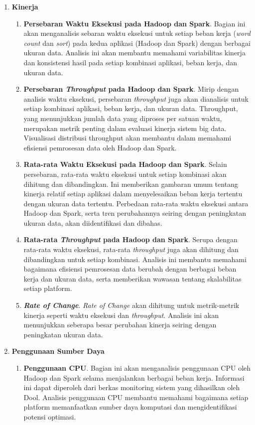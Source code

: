 \begin{enumerate}	
	\item \textbf{Kinerja}
	\begin{enumerate}
		\item \textbf{Persebaran Waktu Eksekusi pada Hadoop dan Spark}. Bagian ini akan menganalisis sebaran waktu eksekusi untuk setiap beban kerja (\textit{word count} dan \textit{sort}) pada kedua aplikasi (Hadoop dan Spark) dengan berbagai ukuran data. Analisis ini akan membantu memahami variabilitas kinerja dan konsistensi hasil pada setiap kombinasi aplikasi, beban kerja, dan ukuran data.
		\item \textbf{Persebaran \textit{Throughput} pada Hadoop dan Spark}. Mirip dengan analisis waktu eksekusi, persebaran \textit{throughput} juga akan dianalisis untuk setiap kombinasi aplikasi, beban kerja, dan ukuran data. Throughput, yang menunjukkan jumlah data yang diproses per satuan waktu,  merupakan metrik penting dalam evaluasi kinerja sistem big data.  Visualisasi distribusi throughput akan membantu dalam memahami efisiensi pemrosesan data oleh Hadoop dan Spark.
		\item \textbf{Rata-rata Waktu Eksekusi pada Hadoop dan Spark}. Selain persebaran, rata-rata waktu eksekusi untuk setiap kombinasi akan dihitung dan dibandingkan.  Ini memberikan gambaran umum tentang kinerja relatif setiap aplikasi dalam menyelesaikan beban kerja tertentu dengan ukuran data tertentu. Perbedaan rata-rata waktu eksekusi antara Hadoop dan Spark, serta tren perubahannya seiring dengan peningkatan ukuran data, akan diidentifikasi dan dibahas.
		\item \textbf{Rata-rata \textit{Throughput} pada Hadoop dan Spark}. Serupa dengan rata-rata waktu eksekusi, rata-rata \textit{throughput} juga akan dihitung dan dibandingkan untuk setiap kombinasi. Analisis ini membantu memahami bagaimana efisiensi pemrosesan data berubah dengan berbagai beban kerja dan ukuran data, serta memberikan wawasan tentang skalabilitas setiap platform.
		\item \textbf{\textit{Rate of Change}}. \textit{Rate of Change} akan dihitung untuk metrik-metrik kinerja seperti waktu eksekusi dan \textit{throughput}. Analisis ini akan menunjukkan seberapa besar perubahan kinerja seiring dengan peningkatan ukuran data.  
	\end{enumerate}
	\item \textbf{Penggunaan Sumber Daya}
	\begin{enumerate}
	\item \textbf{Penggunaan CPU}. Bagian ini akan menganalisis penggunaan CPU oleh Hadoop dan Spark selama menjalankan berbagai beban kerja.  Informasi ini dapat diperoleh dari berkas monitoring sistem yang dihasilkan oleh Dool.  Analisis penggunaan CPU membantu memahami bagaimana setiap platform memanfaatkan sumber daya komputasi dan mengidentifikasi potensi optimasi.

\end{enumerate}
\end{enumerate}
